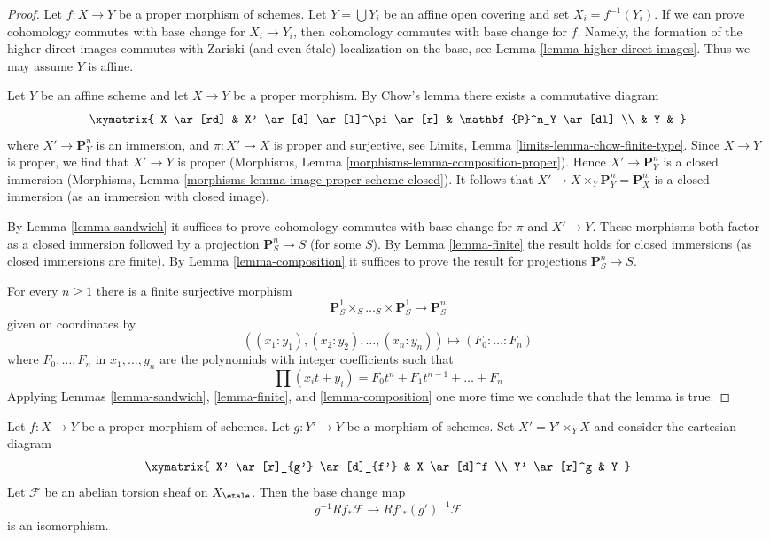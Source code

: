 \begin{proof}
Let $f : X \to Y$ be a proper morphism of schemes.
Let $Y = \bigcup Y_i$ be an affine open covering
and set $X_i = f^{-1}(Y_i)$. If we can prove
cohomology commutes with base change for $X_i \to Y_i$,
then cohomology commutes with base change for $f$.
Namely, the formation of the higher direct images
commutes with Zariski (and even \'etale) localization
on the base, see
Lemma \ref{lemma-higher-direct-images}.
Thus we may assume $Y$ is affine.

\medskip\noindent
Let $Y$ be an affine scheme and let $X \to Y$ be a proper morphism.
By Chow's lemma there exists a commutative diagram
$$
\xymatrix{
X \ar[rd] & X' \ar[d] \ar[l]^\pi \ar[r] & \mathbf{P}^n_Y \ar[dl] \\
& Y &
}
$$
where $X' \to \mathbf{P}^n_Y$ is an immersion, and
$\pi : X' \to X$ is proper and surjective, see
Limits, Lemma \ref{limits-lemma-chow-finite-type}.
Since $X \to Y$ is proper, we find that $X' \to Y$ is proper
(Morphisms, Lemma \ref{morphisms-lemma-composition-proper}).
Hence $X' \to \mathbf{P}^n_Y$ is a closed immersion
(Morphisms, Lemma \ref{morphisms-lemma-image-proper-scheme-closed}).
It follows that $X' \to X \times_Y \mathbf{P}^n_Y = \mathbf{P}^n_X$
is a closed immersion (as an immersion with closed image).

\medskip\noindent
By Lemma \ref{lemma-sandwich}
it suffices to prove cohomology commutes with base change for
$\pi$ and $X' \to Y$. These morphisms both factor as a closed
immersion followed by a projection $\mathbf{P}^n_S \to S$ (for some $S$).
By Lemma \ref{lemma-finite} the result holds for closed
immersions (as closed immersions are finite).
By Lemma \ref{lemma-composition} it suffices to prove the
result for projections $\mathbf{P}^n_S \to S$.

\medskip\noindent
For every $n \geq 1$ there is a finite surjective morphism
$$
\mathbf{P}^1_S \times_S \ldots_S \times \mathbf{P}^1_S
\longrightarrow
\mathbf{P}^n_S
$$
given on coordinates by
$$
((x_1 : y_1), (x_2 : y_2), \ldots, (x_n : y_n))
\longmapsto
(F_0 : \ldots : F_n)
$$
where $F_0, \ldots, F_n$ in $x_1, \ldots, y_n$
are the polynomials with integer coefficients such that
$$
\prod (x_i t + y_i) = F_0 t^n + F_1 t^{n - 1} + \ldots + F_n
$$
Applying
Lemmas \ref{lemma-sandwich}, \ref{lemma-finite}, and \ref{lemma-composition}
one more time we conclude that the lemma is true.
\end{proof}

\begin{theorem}
\label{theorem-proper-base-change}
Let $f : X \to Y$ be a proper morphism of schemes. Let $g : Y' \to Y$ be
a morphism of schemes. Set $X' = Y' \times_Y X$
and consider the cartesian diagram
$$
\xymatrix{
X' \ar[r]_{g'} \ar[d]_{f'} & X \ar[d]^f \\
Y' \ar[r]^g & Y
}
$$
Let $\mathcal{F}$ be an abelian torsion sheaf on $X_\etale$.
Then the base change map
$$
g^{-1}Rf_*\mathcal{F} \longrightarrow Rf'_*(g')^{-1}\mathcal{F}
$$
is an isomorphism.
\end{theorem}

